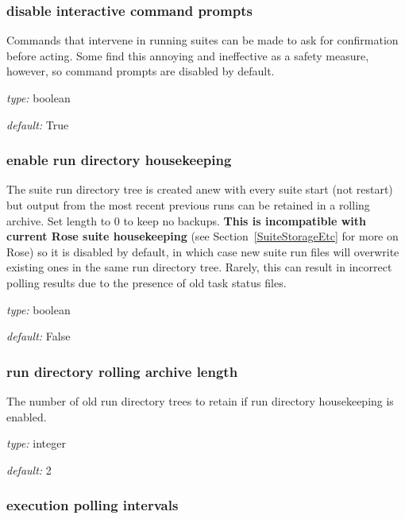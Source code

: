 \subsubsection{disable interactive command prompts}

Commands that intervene in running suites can be made to ask for
confirmation before acting. Some find this annoying and ineffective as a
safety measure, however, so command prompts are disabled by default.

\begin{myitemize}
\item {\em type:} boolean
\item {\em default:} True
\end{myitemize}

\subsubsection{enable run directory housekeeping}

The suite run directory tree is created anew with every suite start
(not restart) but output from the most recent previous runs can be
retained in a rolling archive. Set length to 0 to keep no backups.
{\bf This is incompatible with current Rose suite housekeeping} (see
Section~\ref{SuiteStorageEtc} for more on Rose) so it is disabled by
default, in which case new suite run files will overwrite existing ones
in the same run directory tree. Rarely, this can result in incorrect
polling results due to the presence of old task status files.

\begin{myitemize}
\item {\em type:} boolean
\item {\em default:} False
\end{myitemize}

\subsubsection{run directory rolling archive length}

The number of old run directory trees to retain if run directory
housekeeping is enabled.
\begin{myitemize}
\item {\em type:} integer
\item {\em default:} 2
\end{myitemize}

\subsubsection{execution polling intervals}
\label{execution_polling}

